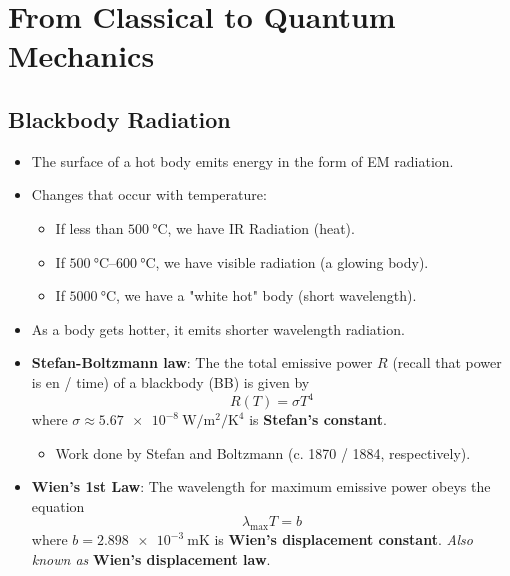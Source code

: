\documentclass[../notes.tex]{subfiles}
\begin{document}
\chapter{From Classical to Quantum Mechanics}
\section{Blackbody Radiation}
\begin{itemize}
    \item {}The surface of a hot body emits energy in the form of EM radiation.
    \item Changes that occur with temperature:
    \begin{itemize}
        \item If less than $\SI{500}{\celsius}$, we have IR Radiation (heat).
        \item If $\SIrange{500}{600}{\celsius}$, we have visible radiation (a glowing body).
        \item If $\SI{5000}{\celsius}$, we have a "white hot" body (short wavelength).
    \end{itemize}
    \item As a body gets hotter, it emits shorter wavelength radiation.
    \item \textbf{Stefan-Boltzmann law}: The the total emissive power $R$ (recall that power is en / time) of a blackbody (BB) is given by
    \begin{equation*}
        R(T) = \sigma T^4
    \end{equation*}
    where $\sigma\approx\SI{5.67e-8}{\watt\per\square\meter\per\kelvin\tothe{4}}$ is \textbf{Stefan's constant}.
    \begin{itemize}
        \item Work done by Stefan and Boltzmann (c. 1870 / 1884, respectively).
    \end{itemize}
    \item \textbf{Wien's 1st Law}: The wavelength for maximum emissive power obeys the equation
    \begin{equation*}
        \lambda_\text{max}T = b
    \end{equation*}
    where $b=\SI{2.898e-3}{\meter\kelvin}$ is \textbf{Wien's displacement constant}. \emph{Also known as} \textbf{Wien's displacement law}.
    \begin{figure}[h!]
        \centering
\end{figure}
\end{itemize}
\end{document}
